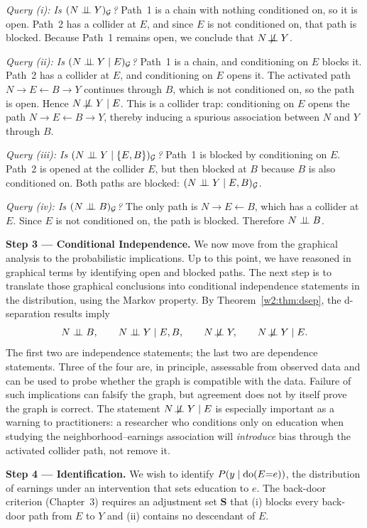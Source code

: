 \documentclass[master.tex]{subfiles}
\begin{document}
\smallskip
\emph{Query (i): Is $(N \perp\!\!\!\perp Y)_{\mathcal{G}}$?}
Path~1 is a chain with nothing conditioned on, so it is open.
Path~2 has a collider at $E$, and since $E$ is not conditioned on, that
path is blocked.
Because Path~1 remains open, we conclude that $N \not\!\perp\!\!\!\perp Y$.

\smallskip
\emph{Query (ii): Is $(N \perp\!\!\!\perp Y \mid E)_{\mathcal{G}}$?}
Path~1 is a chain, and conditioning on $E$ blocks it.
Path~2 has a collider at $E$, and conditioning on $E$ opens it.
The activated path $N \to E \leftarrow B \to Y$ continues through $B$,
which is not conditioned on, so the path is open.
Hence $N \not\!\perp\!\!\!\perp Y \mid E$.
This is a collider trap: conditioning on $E$ opens the path
$N \to E \leftarrow B \to Y$, thereby inducing a spurious association
between $N$ and $Y$ through $B$.

\smallskip
\emph{Query (iii): Is $(N \perp\!\!\!\perp Y \mid \{E, B\})_{\mathcal{G}}$?}
Path~1 is blocked by conditioning on $E$.
Path~2 is opened at the collider $E$, but then blocked at $B$ because
$B$ is also conditioned on.
Both paths are blocked: $(N \perp\!\!\!\perp Y \mid E, B)_{\mathcal{G}}$.

\smallskip
\emph{Query (iv): Is $(N \perp\!\!\!\perp B)_{\mathcal{G}}$?}
The only path is $N \to E \leftarrow B$, which has a collider at $E$.
Since $E$ is not conditioned on, the path is blocked.
Therefore $N \perp\!\!\!\perp B$.

\medskip
\noindent\textbf{Step 3 --- Conditional Independence.}
We now move from the graphical analysis to the probabilistic implications.
Up to this point, we have reasoned in graphical terms by identifying open
and blocked paths.
The next step is to translate those graphical conclusions into conditional
independence statements in the distribution, using the Markov property.
By Theorem~\ref{w2:thm:dsep}, the d-separation results imply
\[
  N \indep B, \qquad
  N \indep Y \mid E, B, \qquad
  N \nindep Y, \qquad
  N \nindep Y \mid E.
\]
The first two are independence statements; the last two are dependence
statements.
Three of the four are, in principle, assessable from observed data and
can be used to probe whether the graph is compatible with the data.
Failure of such implications can falsify the graph, but agreement does
not by itself prove the graph is correct.
The statement $N \not\!\perp\!\!\!\perp Y \mid E$ is especially important as a warning
to practitioners: a researcher who conditions only on education when
studying the neighborhood--earnings association will \emph{introduce}
bias through the activated collider path, not remove it.

\medskip
\noindent\textbf{Step 4 --- Identification.}
We wish to identify $P(y \mid \mathrm{do}(E{=}e))$, the distribution of earnings
under an intervention that sets education to $e$.
The back-door criterion (Chapter~3) requires an adjustment set
$\mathbf{S}$ that (i) blocks every back-door path from $E$ to $Y$ and
(ii) contains no descendant of $E$.
\end{document}
